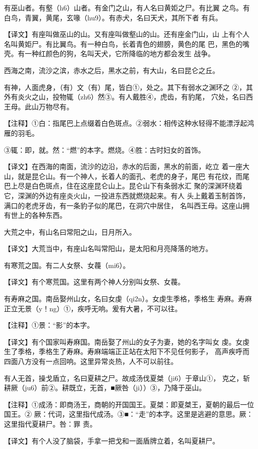 \documentclass[a4paper,12pt,UTF8,twoside]{ctexbook}
\begin{document}
有巫山者。有壑（h6）山者。有金门之山，有人名曰黄姖之尸。有比翼 之鸟。有白鸟，青翼，黄尾，玄喙（hu9）。有赤犬，名曰天犬，其所下者 有兵。

【译文】有座叫做巫山的山。又有座叫做壑山的山。还有座金门山，山 上有个人名叫黄姖尸。有比翼鸟。有一种白鸟，长着青色的翅膀，黄色的尾 巴，黑色的嘴壳。有一种红颜色的狗，名叫天犬，它所降临的地方都会发生 战争。

西海之南，流沙之滨，赤水之后，黑水之前，有大山，名曰昆仑之丘。

有神，人面虎身，（有）文（有）尾，皆白①，处之。其下有弱水之渊环之 ②，其外有炎火之山，投物辄（zh6）然③。有人戴胜④，虎齿，有豹尾， 穴处，名曰西王母。此山万物尽有。

【注释】①白：指尾巴上点缀着白色斑点。②弱水：相传这种水轻得不能漂浮起鸿雁的羽毛。

③辄：即，就。然：“燃”的本字。燃烧。④胜：古时妇女的首饰。

【译文】在西海的南面，流沙的边沿，赤水的后面，黑水的前面，屹立 着一座大山，就是昆仑山。有一个神人，长着人的面孔、老虎的身子，尾巴 有花纹，而尾巴上尽是白色斑点，住在这座昆仑山上。昆仑山下有条弱水汇 聚的深渊环绕着它，深渊的外边有座炎火山，一投进东西就燃烧起来。有人 头上戴着玉制首饰，满口的老虎牙齿，有一条豹子似的尾巴，在洞穴中居住， 名叫西王母。这座山拥有世上的各种东西。

大荒之中，有山名曰常阳之山，日月所入。

【译文】大荒当中，有座山名叫常阳山，是太阳和月亮降落的地方。

有寒荒之国。有二人女祭、女薎（mi6）。

【译文】有个寒荒国。这里有两个神人分别叫女祭、女薎。

有寿麻之国。南岳娶州山女，名曰女虔（qi2n）。女虔生季格，季格生 寿麻。寿麻正立无景（y！ng）①，疾呼无响。爰有大暑，不可以往。

【注释】①景：“影”的本字。

【译文】有个国家叫寿麻国。南岳娶了州山的女子为妻，她的名字叫女 虔。女虔生了季格，季格生了寿麻。寿麻端端正正站在太阳下不见任何影子， 高声疾呼而四面八方没有一点回响。这里异常炎热，人不可以前往。

有人无首，操戈盾立，名曰夏耕之尸。故成汤伐夏桀（ji6）于章山①， 克之，斩耕厥（ju6）前②。耕既立，无首，■厥咎（ji））③，乃降于巫山。

【注释】①成汤：即商汤王，商朝的开国国王。夏桀：即夏桀王，夏朝的最后一位国王。② 厥：代词，这里指代成汤。③■：“走”的本字。这里是逃避的意思。厥：这里指代夏耕尸。咎：罪 责。

【译文】有个人没了脑袋，手拿一把戈和一面盾牌立着，名叫夏耕尸。
\end{document}
